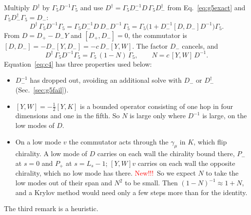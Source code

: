 \documentclass[11pt,a4paper]{article}
\newif\ifshownew \shownewtrue
\DeclareRobustCommand\New{\ifshownew\textcolor{red}{New!!!}\ \else\ignorespaces\fi}
\numberwithin{equation}{section}
\newcommand{\dg}{^{\dagger}}
\newcommand{\Pp}{P_{+}}
\newcommand{\Pm}{P_{-}}
\newcommand{\Gfive}{\Gamma_5}
\newif\ifresults
\begin{document}
Multiply $D\dg$ by $\Gfive D^{-1}\Gfive$ and use $D\dg=\Gfive D_-^{-1}D\,\Gfive D_-\dg$ from
Eq.~\eqref{eq:g5exact} and $\Gfive D_-\dg\Gfive=D_-$:
\begin{equation}
D\dg\,\Gfive D^{-1}\Gfive=\Gfive D_-^{-1}D\,D_-D^{-1}\,\Gfive
=\Gfive\big(1+D_-^{-1}[D,D_-]D^{-1}\big)\Gfive .
\end{equation}
From $D=D_+-D_-Y$ and $[D_+,D_-]=0$, the commutator is
$[D,D_-]=-D_-[Y,D_-]=-c\,D_-[Y,W]$. The factor $D_-$ cancels, and
\begin{equation}
\boxed{\;D\dg\,\Gfive D^{-1}\Gfive=\Gfive\,(1-N)\,\Gfive,\qquad N=c\,[Y,W]\,D^{-1}.\;}
\label{eq:c4}
\end{equation}
Equation~\eqref{eq:c4} has three properties used below:
\begin{itemize}
\item $D_-^{-1}$ has dropped out, avoiding an additional solve with $D_-$ or $D_-\dg$
(Sec.~\ref{sec:g5fail}).
\item $[Y,W]=-\tfrac12[Y,K]$ is a bounded operator consisting of one hop in four dimensions and one in the
fifth. So $N$ is large only where $D^{-1}$ is large, on the low modes of $D$.
\item On a low mode $v$ the commutator acts through the $\gamma_\mu$ in $K$, which flip
chirality. A low mode of $D$ carries on each wall the chirality bound there, $\Pm$ at $s=0$ and
$\Pp$ at $s=L_s-1$; $[Y,W]v$ carries on each wall the opposite chirality, which no low mode has
there. \New So we expect $N$ to take the low modes out of their
span and $N^2$ to be small. Then $(1-N)^{-1}\approx1+N$, and a Krylov method would need only a few
steps more than for the identity.
\end{itemize}
The third remark is a heuristic\ifresults{}; \New Sec.~\ref{sec:daggerresults}
tests the resulting preconditioner directly; it does not measure $\|N^2\|$\fi.
\end{document}
